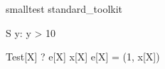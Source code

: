 \begin{zsection}
\SECTION smalltest \parents standard\_toolkit
\end{zsection}

\begin{schema}{S}
   y: \nat
\where
   y > 10
\end{schema}



\begin{theorem}{Test}[X]
   \vdash? e[X] \in \langle x[X] \rangle  \iff  e[X] = (1, x[X])
\end{theorem}



